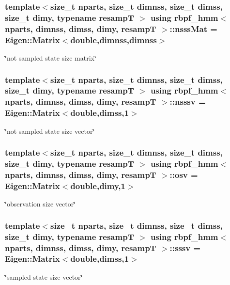 \subsubsection[{\texorpdfstring{nsss\+Mat}{nsssMat}}]{\setlength{\rightskip}{0pt plus 5cm}template$<$size\+\_\+t nparts, size\+\_\+t dimnss, size\+\_\+t dimss, size\+\_\+t dimy, typename resampT $>$ using {\bf rbpf\+\_\+hmm}$<$ nparts, dimnss, dimss, dimy, resampT $>$\+::{\bf nsss\+Mat} =  Eigen\+::\+Matrix$<$double,dimnss,dimnss$>$}\hypertarget{classrbpf__hmm_a24eee6edeb28e16e01b69c2f7eab4e06}{}\label{classrbpf__hmm_a24eee6edeb28e16e01b69c2f7eab4e06}
\char`\"{}not sampled state size matrix\char`\"{} 
\subsubsection[{\texorpdfstring{nsssv}{nsssv}}]{\setlength{\rightskip}{0pt plus 5cm}template$<$size\+\_\+t nparts, size\+\_\+t dimnss, size\+\_\+t dimss, size\+\_\+t dimy, typename resampT $>$ using {\bf rbpf\+\_\+hmm}$<$ nparts, dimnss, dimss, dimy, resampT $>$\+::{\bf nsssv} =  Eigen\+::\+Matrix$<$double,dimss,1$>$}\hypertarget{classrbpf__hmm_a87376e321cce5bd3211825c509d17440}{}\label{classrbpf__hmm_a87376e321cce5bd3211825c509d17440}
\char`\"{}not sampled state size vector\char`\"{} 
\subsubsection[{\texorpdfstring{osv}{osv}}]{\setlength{\rightskip}{0pt plus 5cm}template$<$size\+\_\+t nparts, size\+\_\+t dimnss, size\+\_\+t dimss, size\+\_\+t dimy, typename resampT $>$ using {\bf rbpf\+\_\+hmm}$<$ nparts, dimnss, dimss, dimy, resampT $>$\+::{\bf osv} =  Eigen\+::\+Matrix$<$double,dimy,1$>$}\hypertarget{classrbpf__hmm_a6ce5868477ec9ad6eaa3b3b23e99e1ae}{}\label{classrbpf__hmm_a6ce5868477ec9ad6eaa3b3b23e99e1ae}
\char`\"{}observation size vector\char`\"{} 
\subsubsection[{\texorpdfstring{sssv}{sssv}}]{\setlength{\rightskip}{0pt plus 5cm}template$<$size\+\_\+t nparts, size\+\_\+t dimnss, size\+\_\+t dimss, size\+\_\+t dimy, typename resampT $>$ using {\bf rbpf\+\_\+hmm}$<$ nparts, dimnss, dimss, dimy, resampT $>$\+::{\bf sssv} =  Eigen\+::\+Matrix$<$double,dimss,1$>$}\hypertarget{classrbpf__hmm_aa7d73e78fca38e3652890c5c3680dee9}{}\label{classrbpf__hmm_aa7d73e78fca38e3652890c5c3680dee9}
\char`\"{}sampled state size vector\char`\"{} 

